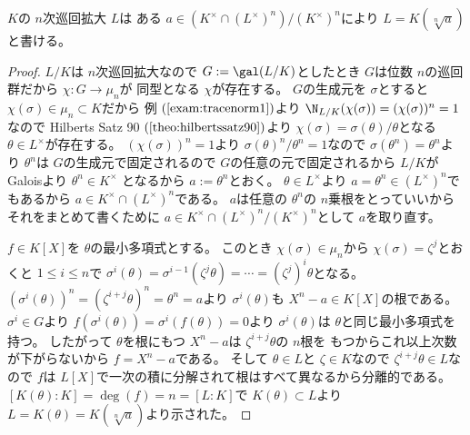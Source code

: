 \documentclass[../master_galois_theory]{subfiles}
\begin{document}
\begin{theo}
  $K$の $n$次巡回拡大 $L$は
  ある $a \in (K^\times \cap (L^\times)^n)/(K^\times)^n$により
  $L = K(\sqrt[n]{a})$と書ける。
\end{theo}

\begin{proof}
  $L/K$は $n$次巡回拡大なので $G := \gal(L/K)$としたとき
  $G$は位数 $n$の巡回群だから $\chi : G \longrightarrow \mu_n$が
  同型となる $\chi$が存在する。
  $G$の生成元を $\sigma$とすると $\chi(\sigma) \in \mu_n \subset K$だから
  例 $(\mathrm{\ref{exam:tracenorm1}})$より
  $\N_{L/K}(\chi(\sigma)) = (\chi(\sigma))^n = 1$なので
  \rm{Hilberts Satz 90} $(\mathrm{\ref{theo:hilbertssatz90}})$より
  $\chi(\sigma) = \sigma(\theta)/\theta$となる $\theta \in L^\times$が存在する。
  $(\chi(\sigma))^n = 1$より $\sigma(\theta)^n/\theta^n = 1$なので
  $\sigma(\theta^n) = \theta^n$より $\theta^n$は $G$の生成元で固定されるので
  $G$の任意の元で固定されるから $L/K$が\rm{Galois}より $\theta^n \in K^\times$
  となるから $a := \theta^n$とおく。
  $\theta \in L^\times$より $a = \theta^n \in (L^\times)^n$でもあるから
  $a \in K^\times \cap (L^\times)^n$である。
  $a$は任意の $\theta^n$の $n$乗根をとっていいからそれをまとめて書くために
  $a \in K^\times \cap (L^\times)^n / (K^\times)^n$として $a$を取り直す。

  $f \in K[X]$を $\theta$の最小多項式とする。
  このとき $\chi(\sigma) \in \mu_n$から $\chi(\sigma) = \zeta^j$とおくと
  $1 \leq i \leq n$で
  $\sigma^i(\theta) = \sigma^{i-1}(\zeta^j \theta) = \cdots = (\zeta^j)^i \theta$となる。
  $(\sigma^i(\theta))^n = (\zeta^{i + j} \theta)^n = \theta^n = a$より
  $\sigma^i(\theta)$も $X^n - a \in K[X]$の根である。
  $\sigma^i \in G$より $f(\sigma^i(\theta)) = \sigma^i(f(\theta)) = 0$より
  $\sigma^i(\theta)$は $\theta$と同じ最小多項式を持つ。
  したがって $\theta$を根にもつ $X^n - a$は $\zeta^{i + j} \theta$の $n$根を
  もつからこれ以上次数が下がらないから $f = X^n - a$である。
  そして $\theta \in L$と $\zeta \in K$なので $\zeta^{i + j} \theta \in L$なので $f$は $L[X]$で一次の積に分解されて根はすべて異なるから分離的である。
  $[K(\theta):K] = \deg(f) = n = [L:K]$で $K(\theta) \subset L$より
  $L = K(\theta) = K(\sqrt[n]{a})$より示された。
\end{proof}
\end{document}

